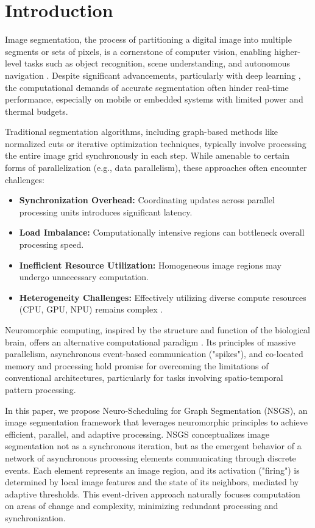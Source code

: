 \documentclass[conference]{IEEEtran}
\begin{document}
\section{Introduction}
Image segmentation, the process of partitioning a digital image into multiple segments or sets of pixels, is a cornerstone of computer vision, enabling higher-level tasks such as object recognition, scene understanding, and autonomous navigation \cite{Haralick1985}. Despite significant advancements, particularly with deep learning \cite{Minaee2021, Long2015, Ronneberger2015}, the computational demands of accurate segmentation often hinder real-time performance, especially on mobile or embedded systems with limited power and thermal budgets.

Traditional segmentation algorithms, including graph-based methods like normalized cuts \cite{Shi2000} or iterative optimization techniques, typically involve processing the entire image grid synchronously in each step. While amenable to certain forms of parallelization (e.g., data parallelism), these approaches often encounter challenges:
\begin{itemize}
    \item \textbf{Synchronization Overhead:} Coordinating updates across parallel processing units introduces significant latency.
    \item \textbf{Load Imbalance:} Computationally intensive regions can bottleneck overall processing speed.
    \item \textbf{Inefficient Resource Utilization:} Homogeneous image regions may undergo unnecessary computation.
    \item \textbf{Heterogeneity Challenges:} Effectively utilizing diverse compute resources (CPU, GPU, NPU) remains complex \cite{Christensen2022}.
\end{itemize}

Neuromorphic computing, inspired by the structure and function of the biological brain, offers an alternative computational paradigm \cite{Mead1990, Davies2018, Akopyan2015}. Its principles of massive parallelism, asynchronous event-based communication ("spikes"), and co-located memory and processing hold promise for overcoming the limitations of conventional architectures, particularly for tasks involving spatio-temporal pattern processing.

In this paper, we propose Neuro-Scheduling for Graph Segmentation (NSGS), an image segmentation framework that leverages neuromorphic principles to achieve efficient, parallel, and adaptive processing. NSGS conceptualizes image segmentation not as a synchronous iteration, but as the emergent behavior of a network of asynchronous processing elements communicating through discrete events. Each element represents an image region, and its activation ("firing") is determined by local image features and the state of its neighbors, mediated by adaptive thresholds. This event-driven approach naturally focuses computation on areas of change and complexity, minimizing redundant processing and synchronization.
\end{document}
